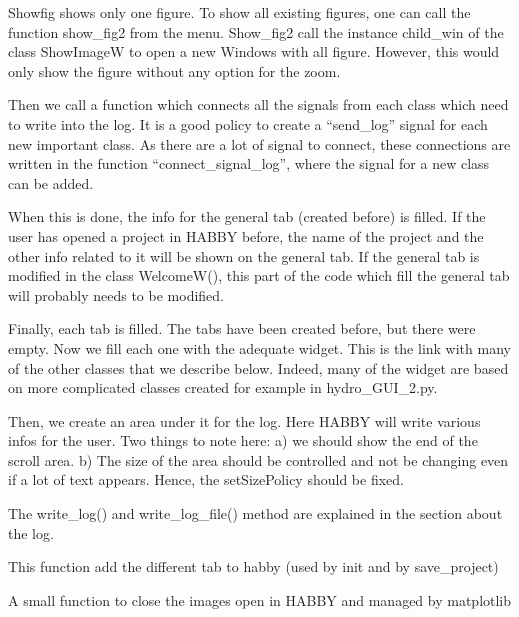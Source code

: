 \documentclass[letterpaper,10pt,english]{sphinxmanual}
\begin{document}
\begin{fulllineitems}
Showfig shows only one figure. To show all existing figures, one can call the function show\_fig2 from the menu.
Show\_fig2 call the instance child\_win of the class ShowImageW to open a new Windows with all figure. However,
this would only show the figure without any option for the zoom.

Then we call a function which connects all the signals from each class which need to write into the log. It is a good
policy to create a “send\_log” signal for each new important class. As there are a lot of signal to connect, these
connections are written in the function “connect\_signal\_log”, where the signal for a new class can be added.

When this is done, the info for the general tab (created before) is filled. If the user has opened a project in HABBY
before, the name of the project and the other info related to it will be shown on the general tab. If the general
tab is modified in the class WelcomeW(), this part of the code which fill the general tab will probably needs to
be modified.

Finally, each tab is filled. The tabs have been created before, but there were empty. Now we fill each one with the
adequate widget. This is the link with many of the other classes that we describe below. Indeed, many of the widget
are based on more complicated classes created for example in hydro\_GUI\_2.py.

Then, we create an area under it for the log. Here HABBY will write various infos for the user. Two things to note
here: a) we should show the end of the scroll area. b) The size of the area should be controlled and not be
changing even if a lot of text appears. Hence, the setSizePolicy should be fixed.

The write\_log() and write\_log\_file() method are explained in the section about the log.

\begin{fulllineitems}
\label{\detokenize{index:src_GUI.Main_windows_1.CentralW.add_all_tab}}
This function add the different tab to habby (used by init and by save\_project)

\end{fulllineitems}


\begin{fulllineitems}
\label{\detokenize{index:src_GUI.Main_windows_1.CentralW.closefig}}
A small function to close the images open in HABBY and managed by matplotlib


\end{fulllineitems}
\end{fulllineitems}
\end{document}
